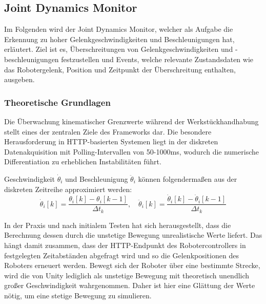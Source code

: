 \subsection{Joint Dynamics Monitor}
\label{sssec:joint_dynamics_monitor}
Im Folgenden wird der Joint Dynamics Monitor, welcher als Aufgabe die Erkennung
zu hoher Gelenkgeschwindigkeiten und Beschleunigungen hat, erläutert. Ziel ist
es, Überschreitungen von Gelenkgeschwindigkeiten und -beschleunigungen
festzustellen und Events, welche relevante Zustandsdaten wie das Robotergelenk,
Position und Zeitpunkt der Überschreitung enthalten, ausgeben.

\subsubsection{Theoretische Grundlagen}
Die Überwachung kinematischer Grenzwerte
während der Werkstückhandhabung stellt eines der zentralen Ziele des
Frameworks dar. Die besondere Herausforderung in HTTP-basierten Systemen
liegt in der diskreten Datenakquisition mit Polling-Intervallen von 50-1000ms,
wodurch die numerische Differentiation zu erheblichen Instabilitäten
führt.

Geschwindigkeit $\dot{\theta}_i$ und Beschleunigung $\ddot{\theta}_i$
können folgendermaßen aus der diskreten Zeitreihe approximiert werden:
\begin{equation}
  \dot{\theta}_i[k] = \frac{\theta_i[k] - \theta_i[k-1]}{\Delta t_k}, \quad
  \ddot{\theta}_i[k] = \frac{\dot{\theta}_i[k] -
  \dot{\theta}_i[k-1]}{\Delta t_k}
  \label{eq:discrete_derivatives}
\end{equation}

In der Praxis und nach initialem Testen hat sich herausgestellt, dass die
Berechnung dessen durch die unstetige Bewegung unrealistische Werte liefert.
Das hängt damit zusammen, dass der HTTP-Endpunkt des Robotercontrollers in
festgelegten Zeitabständen abgefragt wird und so die Gelenkpositionen des
Roboters erneuert werden. Bewegt sich der Roboter über eine bestimmte Strecke,
wird die von Unity lediglich als unstetige Bewegung mit theoretisch unendlich
großer Geschwindigkeit wahrgenommen. Daher ist hier eine Glättung der Werte
nötig, um eine stetige Bewegung zu simulieren.

